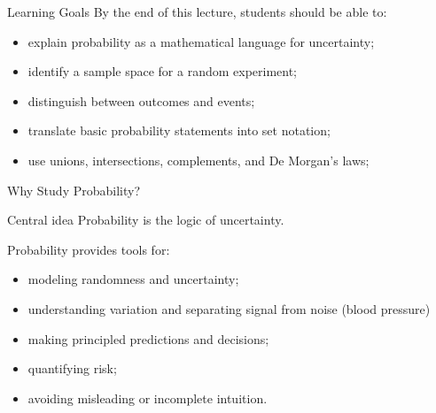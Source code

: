 \setcounter{framenumber}{0}

\begin{frame}
  \titlepage
\end{frame}

\begin{frame}{Learning Goals}
By the end of this lecture, students should be able to:
\begin{itemize}
    \item explain probability as a mathematical language for uncertainty;
    \item identify a sample space for a random experiment;
    \item distinguish between outcomes and events;
    \item translate basic probability statements into set notation;
    \item use unions, intersections, complements, and De Morgan's laws;
\end{itemize}
\end{frame}

\begin{frame}{Why Study Probability?}
\begin{keybox}{Central idea}
Probability is the logic of uncertainty.
\end{keybox}

\vspace{0.25cm}

Probability provides tools for:
\begin{itemize}
    \item modeling randomness and uncertainty;
    \item understanding variation and separating signal from noise (blood pressure)
    \item making principled predictions and decisions;
    \item quantifying risk;
    \item avoiding misleading or incomplete intuition.
\end{itemize}
\end{frame}




